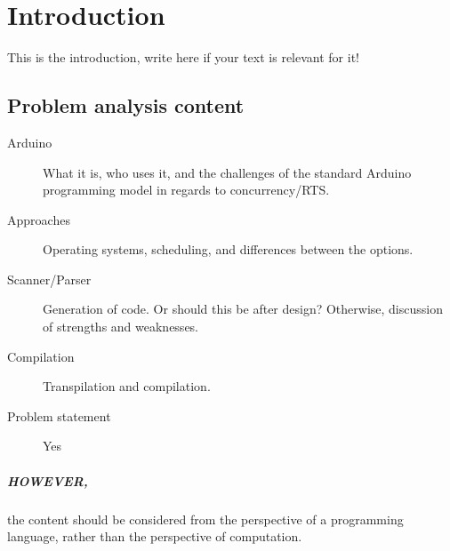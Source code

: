 \chapter{Introduction}\label{cha:introduction}
This is the introduction, write here if your text is relevant for it!

\section{Problem analysis content}
\begin{description}
    \item [Arduino] What it is, who uses it, and the challenges of the standard Arduino programming  model in regards to concurrency/RTS.
    \item [Approaches] Operating systems, scheduling, and differences between the options.
    \item [Scanner/Parser] Generation of code. Or should this be after design? Otherwise, discussion of strengths and weaknesses.
    \item [Compilation] Transpilation and compilation.
    \item [Problem statement] Yes
\end{description}

\paragraph{HOWEVER,} the content should be considered from the perspective of a programming language, rather than the perspective of computation.